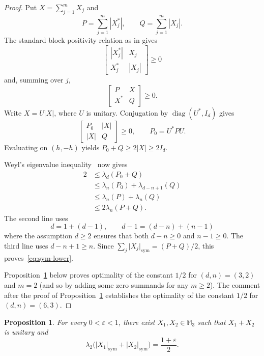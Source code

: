 \documentclass[11pt]{amsart}
\numberwithin{equation}{section}
\newtheorem{proposition}[theorem]{Proposition}
\newcommand{\diag}{\operatorname{diag}}
\newcommand{\smod}[1]{\lvert #1\rvert_{\mathrm{sym}}}
\begin{document}
\begin{proof}
Put $X=\sum_{j=1}^mX_j$ and
\[
 P=\sum_{j=1}^m|X_j^*|,
 \qquad
 Q=\sum_{j=1}^m|X_j|.
\]
The standard block positivity relation as in \cite[Sec.\ 3]{BourinLee2026} gives
\[
 \begin{bmatrix}|X_j^*|&X_j\\X_j^*&|X_j|\end{bmatrix}\geq0
\]
and, summing over $j$, 
\[
 \begin{bmatrix}P&X\\X^*&Q\end{bmatrix}\geq0.
\]
Write $X=U|X|$, where $U$ is unitary. Conjugation by $\diag(U^*,I_d)$ gives
\[
 \begin{bmatrix}P_0&|X|\\|X|&Q\end{bmatrix}\geq0,
 \qquad P_0=U^*PU.
\]
Evaluating on $(h,-h)$ yields $P_0+Q\geq2|X|\geq2I_d$.

Weyl's eigenvalue inequality~\cite[Chapter~III]{Bhatia} now gives
\begin{align*}
 2
 &\leq\lambda_d(P_0+Q)\\
 &\leq\lambda_n(P_0)+\lambda_{d-n+1}(Q)\\
 &\leq\lambda_n(P)+\lambda_n(Q)\\
 &\leq2\lambda_n(P+Q).
\end{align*}
The second line uses 
$$
d=1+(d-1), \qquad d-1= (d-n)+(n-1)
$$
where the assumption $d\ge 2$ ensures that both $d-n\ge 0$ and $n-1\ge 0$.
The third line uses $d-n+1\geq n$. Since $\sum_j\smod{X_j}=(P+Q)/2$, this proves~\eqref{eq:sym-lower}. 

 Proposition~\ref{prop:sym-sharp} below proves optimality of the constant $1/2$ for $(d,n)=(3,2)$ and  $m=2$ (and so by   adding some zero summands for any $m\ge 2$). The comment after the proof of Proposition~\ref{prop:sym-sharp} establishes the optimality of the constant $1/2$ for $(d,n)=(6,3)$. 
\end{proof}

\begin{proposition}\label{prop:sym-sharp}
For every $0<\varepsilon<1$, there exist $X_1,X_2\in\mathbb M_3$ such that $X_1+X_2$ is unitary and
\begin{equation}\label{eq:sym-example}
 \lambda_2\bigl(\smod{X_1}+\smod{X_2}\bigr)
 =\frac{1+\varepsilon}{2}.
\end{equation}
\end{proposition}
\end{document}
